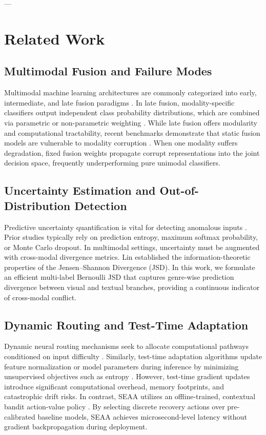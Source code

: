 \documentclass[journal]{IEEEtran}
\begin{document}
---

\section{Related Work}

\subsection{Multimodal Fusion and Failure Modes}
Multimodal machine learning architectures are commonly categorized into early, intermediate, and late fusion paradigms \cite{liang2022foundations}. In late fusion, modality-specific classifiers output independent class probability distributions, which are combined via parametric or non-parametric weighting \cite{arevalo2017gated}. While late fusion offers modularity and computational tractability, recent benchmarks demonstrate that static fusion models are vulnerable to modality corruption \cite{hendrycks2019benchmarking, ma2022are}. When one modality suffers degradation, fixed fusion weights propagate corrupt representations into the joint decision space, frequently underperforming pure unimodal classifiers.

\subsection{Uncertainty Estimation and Out-of-Distribution Detection}
Predictive uncertainty quantification is vital for detecting anomalous inputs \cite{lakshminarayanan2017simple, hendrycks2017baseline}. Prior studies typically rely on prediction entropy, maximum softmax probability, or Monte Carlo dropout. In multimodal settings, uncertainty must be augmented with cross-modal divergence metrics. Lin \cite{lin1991divergence} established the information-theoretic properties of the Jensen--Shannon Divergence (JSD). In this work, we formulate an efficient multi-label Bernoulli JSD that captures genre-wise prediction divergence between visual and textual branches, providing a continuous indicator of cross-modal conflict.

\subsection{Dynamic Routing and Test-Time Adaptation}
Dynamic neural routing mechanisms seek to allocate computational pathways conditioned on input difficulty \cite{huang2023modality}. Similarly, test-time adaptation algorithms update feature normalization or model parameters during inference by minimizing unsupervised objectives such as entropy \cite{wang2021tent}. However, test-time gradient updates introduce significant computational overhead, memory footprints, and catastrophic drift risks. In contrast, SEAA utilizes an offline-trained, contextual bandit action-value policy \cite{li2010contextual}. By selecting discrete recovery actions over pre-calibrated baseline models, SEAA achieves microsecond-level latency without gradient backpropagation during deployment.
\end{document}
